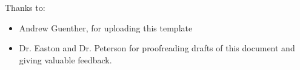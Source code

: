 \noindent
Thanks to:
\begin{itemize}
    \item Andrew Guenther, for uploading this template
    \item Dr. Easton and Dr. Peterson for proofreading drafts of this document and giving valuable feedback.
\end{itemize}
